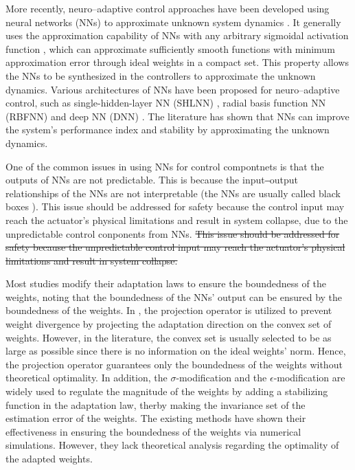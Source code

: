 \documentclass[letterpaper, 10 pt, conference]{ieeeconf}  %
\begin{document}
More recently, neuro–adaptive control approaches have been developed using neural networks (NNs) to approximate unknown system dynamics \cite{Farrell:2006aa}.
It generally uses the approximation capability of NNs with any arbitrary sigmoidal activation function \cite{Cybenko:1989aa}, which can approximate sufficiently smooth functions with minimum approximation error through ideal weights in a compact set.
This property allows the NNs to be synthesized in the controllers to approximate the unknown dynamics.
Various architectures of NNs have been proposed for neuro–adaptive control, such as single-hidden-layer NN (SHLNN) \cite{Esfandiari:2015aa,Gao:2006aa}, radial basis function NN (RBFNN) \cite{Ge:2002aa,Zhou:2023aa} and deep NN (DNN) \cite{Patil:2022aa}.
The literature has shown that NNs can improve the system's performance index and stability by approximating the unknown dynamics.


One of the common issues in using NNs 
\color{red}
for control compontnets
\color{black}
is that the outputs of NNs are not predictable.
This is because the input‒output relationships of the NNs are not interpretable (\ie the NNs are usually called black boxes \cite{Sheu:2020aa,Rudin:2019aa}).
\color{red}
This issue should be addressed for safety because the control input may reach the actuator's physical limitations and result in system collapse, due to the unpredictable control conponents from NNs.
\color{black}
\st{
    This issue should be addressed for safety because the unpredictable control input may reach the actuator's physical limitations and result in system collapse.
}

Most studies modify their adaptation laws to ensure the boundedness of the weights, noting that the boundedness of the NNs' output can be ensured by the boundedness of the weights.
In \cite{Zhou:2023aa,Patil:2022aa}, the projection operator is utilized to prevent weight divergence by projecting the adaptation direction on the convex set of weights.
However, in the literature, the convex set is usually selected to be as large as possible since there is no information on the ideal weights' norm.
Hence, the projection operator guarantees only the boundedness of the weights without theoretical optimality.
In addition, the $\sigma$-modification\cite{Ge:2002aa} and the $\epsilon$-modification \cite{Esfandiari:2015aa,Gao:2006aa} are widely used to regulate the magnitude of the weights by adding a stabilizing function in the adaptation law, therby making the invariance set of the estimation error of the weights. 
The existing methods have shown their effectiveness in ensuring the boundedness of the weights via numerical simulations.
However, they lack theoretical analysis regarding the optimality of the adapted weights.
\end{document}
